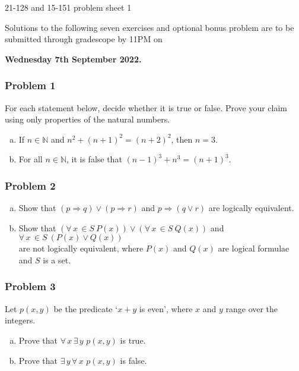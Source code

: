 \documentclass[11pt,onecolumn,fleqn]{article}
\theoremstyle{definition}
\def\fall#1{\forall\, {#1}\,}
\def\fex#1{\exists \,{#1}\,}
\begin{document}
\pagestyle{empty}
\begin{center}
{\Huge
21-128 and 15-151 problem sheet 1
}

Solutions to the following seven exercises and optional bonus problem are to be submitted through 
gradescope by 11PM on

\textbf{Wednesday 7th September 2022.}

\end{center}


\subsubsection*{Problem 1}
For each statement below, decide whether it is true or false. Prove your claim using only properties 
of the natural numbers.
\begin{enumerate}[(a)] \vspace{-10pt}
\item If $n \in \mathbb{N}$ and $n^2+(n+1)^2 = (n+2)^2$, then $n=3$.
\item For all $n \in \mathbb{N}$, it is false that $(n-1)^3 + n^3 = (n+1)^3$.
\end{enumerate}


\subsubsection*{Problem 2}
\begin{enumerate}[(a)]
    \item Show that $( p \Rightarrow q ) \vee ( p \Rightarrow r )$ and $p \Rightarrow ( q \vee r )$ are logically equivalent. 
    \item Show that $(\fall{x} \in S \ P(x)) \vee (\fall{x} \in S \  Q(x))$ and $\fall{x} \in S \  ( P(x) \vee Q(x) )$\\ are not logically equivalent, where $P(x)$ and $Q(x)$ are logical formulae and $S$ is a set.
\end{enumerate}


\subsubsection*{Problem 3}
Let $p(x,y)$ be the predicate `$x + y$ is even', where $x$ and $y$ range over the integers.
\begin{enumerate}[(a)]
\item Prove that $\fall{x} \fex{y}\, p(x,y)$ is true.
\item Prove that $\fex{y}\fall{x}\,  p(x,y)$ is false.
\end{enumerate}
\end{document}
